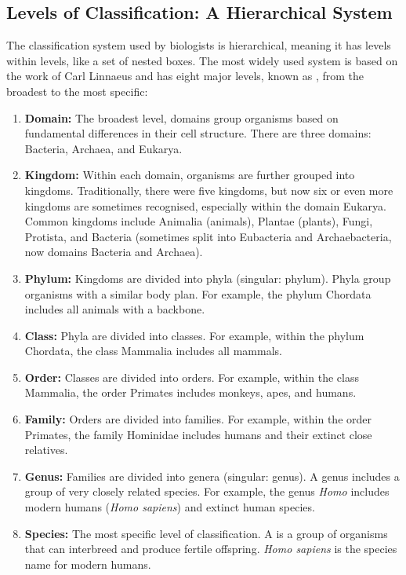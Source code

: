 \subsection{Levels of Classification: A Hierarchical System}

The classification system used by biologists is hierarchical, meaning it has levels within levels, like a set of nested boxes. The most widely used system is based on the work of Carl Linnaeus and has eight major levels, known as , from the broadest to the most specific:

\begin{enumerate}
    \item \textbf{Domain:} The broadest level, domains group organisms based on fundamental differences in their cell structure. There are three domains: Bacteria, Archaea, and Eukarya.
    \item \textbf{Kingdom:} Within each domain, organisms are further grouped into kingdoms.  Traditionally, there were five kingdoms, but now six or even more kingdoms are sometimes recognised, especially within the domain Eukarya.  Common kingdoms include Animalia (animals), Plantae (plants), Fungi, Protista, and Bacteria (sometimes split into Eubacteria and Archaebacteria, now domains Bacteria and Archaea).
    \item \textbf{Phylum:} Kingdoms are divided into phyla (singular: phylum).  Phyla group organisms with a similar body plan. For example, the phylum Chordata includes all animals with a backbone.
    \item \textbf{Class:} Phyla are divided into classes. For example, within the phylum Chordata, the class Mammalia includes all mammals.
    \item \textbf{Order:} Classes are divided into orders.  For example, within the class Mammalia, the order Primates includes monkeys, apes, and humans.
    \item \textbf{Family:} Orders are divided into families. For example, within the order Primates, the family Hominidae includes humans and their extinct close relatives.
    \item \textbf{Genus:} Families are divided into genera (singular: genus). A genus includes a group of very closely related species. For example, the genus \textit{Homo} includes modern humans (\textit{Homo sapiens}) and extinct human species.
    \item \textbf{Species:} The most specific level of classification. A  is a group of organisms that can interbreed and produce fertile offspring.  \textit{Homo sapiens} is the species name for modern humans.
\end{enumerate}


